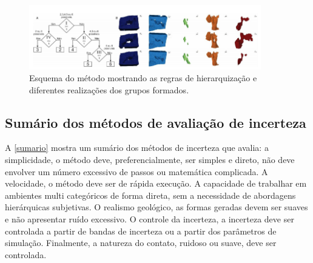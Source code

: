 \begin{figure}[!ht]
	\caption{\label{hier_ex}Esquema do método mostrando as regras de hierarquização e diferentes realizações dos grupos formados.}
	\begin{center}
		\includegraphics[width=0.9\textwidth]{capitulo_2/hier_example.png}
	\end{center}
\end{figure}

\subsection{Sumário dos métodos de avaliação de incerteza}

A \autoref{sumario} mostra um sumário dos métodos de incerteza que avalia: a simplicidade, o método deve, preferencialmente, ser simples e direto, não deve envolver um número excessivo de passos ou matemática complicada. A velocidade, o método deve ser de rápida execução. A capacidade de trabalhar em ambientes multi categóricos de forma direta, sem a necessidade de abordagens hierárquicas subjetivas. O realismo geológico, as formas geradas devem ser suaves e não apresentar ruído excessivo. O controle da incerteza, a incerteza deve ser controlada a partir de bandas de incerteza ou a partir dos parâmetros de simulação. Finalmente, a natureza do contato, ruidoso ou suave, deve ser controlada.

\begin{table}[htbp]
  \centering
  \caption{Sumário dos métodos de avaliação de incerteza de modelos geológicos.}\label{sumario}%
\end{table}%





